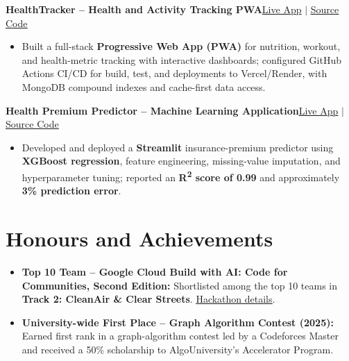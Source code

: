 \documentclass[a4paper,10pt]{article}
\newcommand{\resumeEntry}[2]{%
  \textbf{#1}\hfill {\small #2}\par\vspace{1pt}%
}
\newcommand{\resumeBullet}[1]{\item #1}
\begin{document}
\resumeEntry{HealthTracker -- Health and Activity Tracking PWA}{\href{https://health-tracker-alpha-one.vercel.app}{\underline{Live App}} $|$ \href{https://github.com/aamir-coding/health-tracker}{\underline{Source Code}}}
\begin{itemize}
  \resumeBullet{Built a full-stack \textbf{Progressive Web App (PWA)} for nutrition, workout, and health-metric tracking with interactive dashboards; configured GitHub Actions CI/CD for build, test, and deployments to Vercel/Render, with MongoDB compound indexes and cache-first data access.}
\end{itemize}

\resumeEntry{Health Premium Predictor -- Machine Learning Application}{\href{https://health-prem-prediction.streamlit.app/}{\underline{Live App}} $|$ \href{https://github.com/aamir-coding/health-prem-predict}{\underline{Source Code}}}
\begin{itemize}
  \resumeBullet{Developed and deployed a \textbf{Streamlit} insurance-premium predictor using \textbf{XGBoost regression}, feature engineering, missing-value imputation, and hyperparameter tuning; reported an \textbf{R\textsuperscript{2} score of 0.99} and approximately \textbf{3\% prediction error}.}
\end{itemize}

\section{Honours and Achievements}
\begin{itemize}
  \resumeBullet{\textbf{Top 10 Team -- Google Cloud Build with AI: Code for Communities, Second Edition:} Shortlisted among the top 10 teams in \textbf{Track 2: CleanAir \& Clear Streets}. \href{https://hack2skill.com/event/codeforcommunities2}{\underline{Hackathon details}}.}
  \resumeBullet{\textbf{University-wide First Place -- Graph Algorithm Contest (2025):} Earned first rank in a graph-algorithm contest led by a Codeforces Master and received a 50\% scholarship to AlgoUniversity's Accelerator Program.}
\end{itemize}
\end{document}
